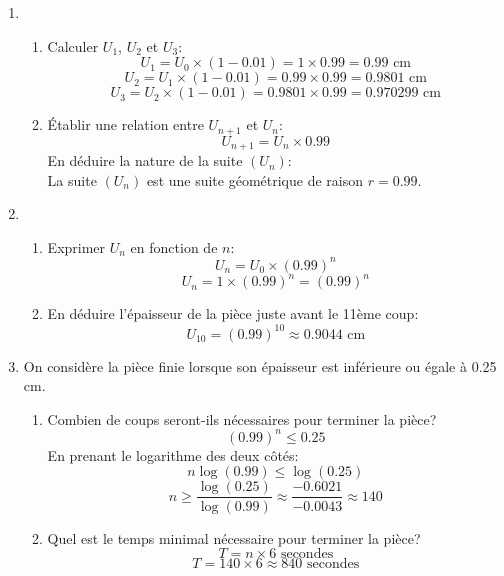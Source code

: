 \documentclass[12pt]{article}
\begin{document}
\begin{enumerate}
    \item 
    \begin{enumerate}
        \item Calculer $U_1$, $U_2$ et $U_3$:
        \[
        U_1 = U_0 \times (1 - 0.01) = 1 \times 0.99 = 0.99 \text{ cm}
        \]
        \[
        U_2 = U_1 \times (1 - 0.01) = 0.99 \times 0.99 = 0.9801 \text{ cm}
        \]
        \[
        U_3 = U_2 \times (1 - 0.01) = 0.9801 \times 0.99 = 0.970299 \text{ cm}
        \]
        \item Établir une relation entre $U_{n+1}$ et $U_n$:
        \[
        U_{n+1} = U_n \times 0.99
        \]
        En déduire la nature de la suite $(U_n)$:
        \\
        La suite $(U_n)$ est une suite géométrique de raison $r = 0.99$.
    \end{enumerate}

    \item 
    \begin{enumerate}
        \item Exprimer $U_n$ en fonction de $n$:
        \[
        U_n = U_0 \times (0.99)^n
        \]
        \[
        U_n = 1 \times (0.99)^n = (0.99)^n
        \]
        \item En déduire l'épaisseur de la pièce juste avant le 11ème coup:
        \[
        U_{10} = (0.99)^{10} \approx 0.9044 \text{ cm}
        \]
    \end{enumerate}

    \item 
    On considère la pièce finie lorsque son épaisseur est inférieure ou égale à 0.25 cm.
    \begin{enumerate}
        \item Combien de coups seront-ils nécessaires pour terminer la pièce?
        \[
        (0.99)^n \leq 0.25
        \]
        En prenant le logarithme des deux côtés:
        \[
        n \log(0.99) \leq \log(0.25)
        \]
        \[
        n \geq \frac{\log(0.25)}{\log(0.99)} \approx \frac{-0.6021}{-0.0043} \approx 140
        \]

        \item Quel est le temps minimal nécessaire pour terminer la pièce?
        \[
        T = n \times 6 \text{ secondes}
        \]
        \[
        T = 140 \times 6 \approx 840 \text{ secondes}
        \]
    \end{enumerate}
\end{enumerate}
\end{document}
